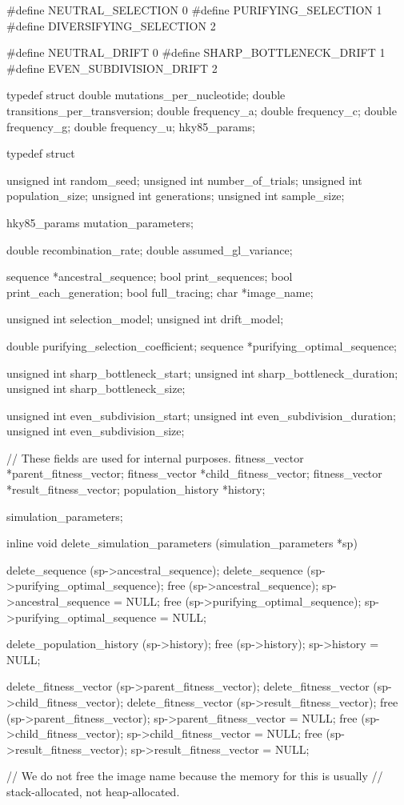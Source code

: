 \documentclass{article}
\begin{document}
\begin{ccode}
#define NEUTRAL_SELECTION 0
#define PURIFYING_SELECTION 1
#define DIVERSIFYING_SELECTION 2

#define NEUTRAL_DRIFT 0
#define SHARP_BOTTLENECK_DRIFT 1
#define EVEN_SUBDIVISION_DRIFT 2

typedef struct {
  double mutations_per_nucleotide;
  double transitions_per_transversion;
  double frequency_a;
  double frequency_c;
  double frequency_g;
  double frequency_u;
} hky85_params;

typedef struct {
  unsigned int		random_seed;
  unsigned int		number_of_trials;
  unsigned int		population_size;
  unsigned int		generations;
  unsigned int		sample_size;

  hky85_params		mutation_parameters;

  double		recombination_rate;
  double		assumed_gl_variance;
  
  sequence		*ancestral_sequence;
  bool			print_sequences;
  bool			print_each_generation;
  bool			full_tracing;
  char			*image_name;

  unsigned int		selection_model;
  unsigned int		drift_model;

  double		purifying_selection_coefficient;
  sequence		*purifying_optimal_sequence;

  unsigned int		sharp_bottleneck_start;
  unsigned int		sharp_bottleneck_duration;
  unsigned int		sharp_bottleneck_size;

  unsigned int		even_subdivision_start;
  unsigned int		even_subdivision_duration;
  unsigned int		even_subdivision_size;

  // These fields are used for internal purposes.
  fitness_vector	*parent_fitness_vector;
  fitness_vector	*child_fitness_vector;
  fitness_vector	*result_fitness_vector;
  population_history	*history;
} simulation_parameters;

inline void delete_simulation_parameters (simulation_parameters *sp) {
  delete_sequence (sp->ancestral_sequence);
  delete_sequence (sp->purifying_optimal_sequence);
  free (sp->ancestral_sequence); sp->ancestral_sequence = NULL;
  free (sp->purifying_optimal_sequence); sp->purifying_optimal_sequence = NULL;

  delete_population_history (sp->history);
  free (sp->history); sp->history = NULL;

  delete_fitness_vector (sp->parent_fitness_vector);
  delete_fitness_vector (sp->child_fitness_vector);
  delete_fitness_vector (sp->result_fitness_vector);
  free (sp->parent_fitness_vector); sp->parent_fitness_vector = NULL;
  free (sp->child_fitness_vector); sp->child_fitness_vector = NULL;
  free (sp->result_fitness_vector); sp->result_fitness_vector = NULL;

  // We do not free the image name because the memory for this is usually
  // stack-allocated, not heap-allocated.
}
\end{ccode}
\end{document}
